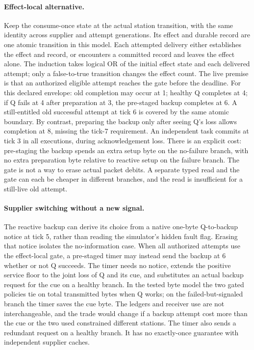 \documentclass{article}
\begin{document}
\paragraph{Effect-local alternative.}
Keep the consume-once state at the actual station transition, with the same
identity across supplier and attempt generations. Its effect and durable
record are one atomic transition in this model. Each attempted delivery
either establishes the effect and record, or encounters a committed record
and leaves the effect alone. The induction takes logical OR of the initial
effect state and each delivered attempt; only a false-to-true transition
changes the effect count. The live premise is that an authorized eligible
attempt reaches the gate before the deadline. For this declared envelope:
old completion may occur at 1; healthy Q completes at 4; if Q fails at 4
after preparation at 3, the pre-staged backup completes at 6. A still-entitled
old successful attempt at tick 6 is covered by the same atomic boundary.
By contrast, preparing the backup only after seeing Q's loss allows
completion at 8, missing the tick-7 requirement. An independent task commits
at tick 3 in all executions, during acknowledgement loss.
There is an explicit cost: pre-staging the backup spends an extra setup
byte on the no-failure branch, with no extra preparation byte relative to
reactive setup on the failure branch. The gate is not a way to erase
actual packet debits. A separate typed read and the gate can each be
cheaper in different branches, and the read is insufficient for a still-live
old attempt.

\paragraph{Supplier switching without a new signal.}
The reactive backup can derive its choice from a native one-byte Q-to-backup
notice at tick 5, rather than reading the simulator's hidden fault flag.
Erasing that notice isolates the no-information case. When all authorized
attempts use the effect-local gate, a pre-staged timer may instead send
the backup at 6 whether or not Q succeeds. The timer needs no notice,
extends the positive service floor to the joint loss of Q and its cue,
and substitutes an actual backup request for the cue on a healthy branch.
In the tested byte model the two gated policies tie on total transmitted bytes
when Q works; on the failed-but-signaled branch the timer saves the cue byte.
The ledgers and receiver use are not interchangeable, and the trade would
change if a backup attempt cost more than the cue or the two used constrained
different stations. The timer also sends a redundant request on a healthy
branch. It has no exactly-once guarantee with independent supplier caches.
\end{document}
